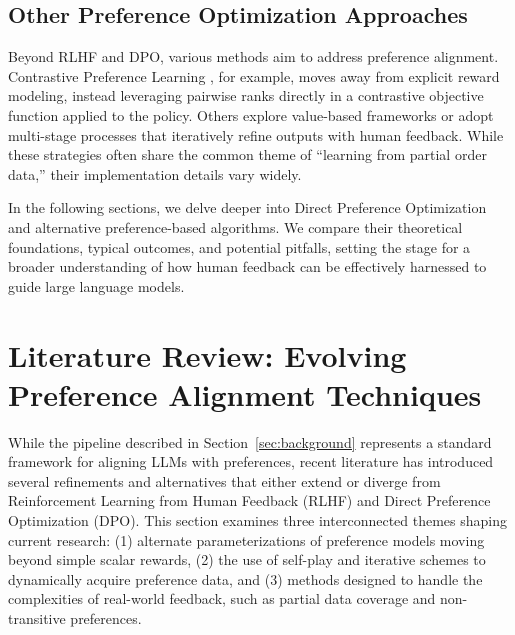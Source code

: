 \documentclass[a4paper,oneside,10pt,ngerman,english]{scrartcl}
\begin{document}
\subsection{Other Preference Optimization Approaches}
Beyond RLHF and DPO, various methods aim to address preference alignment. Contrastive
Preference Learning \cite{bib:zhao2023contrastive}, for example, moves away from explicit
reward modeling, instead leveraging pairwise ranks directly in a contrastive objective function applied to the policy. Others explore
value-based frameworks or adopt multi-stage processes that iteratively refine outputs with
human feedback. While these strategies often share the common theme of “learning from partial
order data,” their implementation details vary widely.

\medskip %
\noindent %
In the following sections, we delve deeper into Direct Preference Optimization and alternative
preference-based algorithms. We compare their theoretical foundations, typical outcomes, and
potential pitfalls, setting the stage for a broader understanding of how human feedback can be
effectively harnessed to guide large language models.

\section{Literature Review: Evolving Preference Alignment Techniques}
\label{sec:litreview}

While the pipeline described in Section~\ref{sec:background} represents a standard framework for
aligning LLMs with preferences, recent literature has introduced several refinements and
alternatives that either extend or diverge from Reinforcement Learning from Human Feedback (RLHF)
and Direct Preference Optimization (DPO). This section examines three interconnected themes shaping
current research: (1) alternate parameterizations of preference models moving beyond simple scalar rewards,
(2) the use of self-play and iterative schemes to dynamically acquire preference data, and
(3) methods designed to handle the complexities of real-world feedback, such as partial data coverage and non-transitive preferences.
\end{document}
